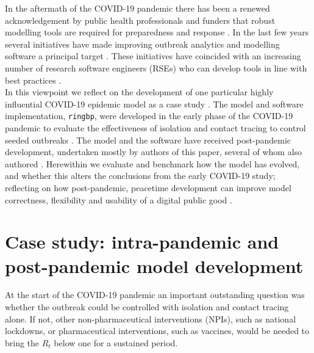 \documentclass[12pt, letterpaper]{article}
\begin{document}
In the aftermath of the COVID-19 pandemic there has been a renewed acknowledgement by public health professionals and funders that robust modelling tools are required for preparedness and response \citep{Becker2021, DHSC2025}. In the last few years several initiatives have made improving outbreak analytics and modelling software a principal target \citep{Morgan2022, TamayoCuartero2025, CDC2026}. These initiatives have coincided with an increasing number of research software engineers (RSEs) who can develop tools in line with best practices \citep{Goth2025, Kijewska2026}. \\

In this viewpoint we reflect on the development of one particular highly influential COVID-19 epidemic model as a case study \citep{Hellewell2020}. The model and software implementation, \texttt{ringbp}, were developed in the early phase of the COVID-19 pandemic to evaluate the effectiveness of isolation and contact tracing to control seeded outbreaks \citep{Hellewell2026}. The model and the software have received post-pandemic development, undertaken mostly by authors of this paper, several of whom also authored \citet{Hellewell2020}. Herewithin we evaluate and benchmark how the model has evolved, and whether this alters the conclusions from the early COVID-19 study; reflecting on how post-pandemic, peacetime development can improve model correctness, flexibility and usability of a digital public good \citep{DPGA2025}.

\section*{Case study: intra-pandemic and post-pandemic model development}

At the start of the COVID-19 pandemic an important outstanding question was whether the outbreak could be controlled with isolation and contact tracing alone. If not, other non-pharmaceutical interventions (NPIs), such as national lockdowns, or pharmaceutical interventions, such as vaccines, would be needed to bring the $R_t$ below one for a sustained period. \\
\end{document}
